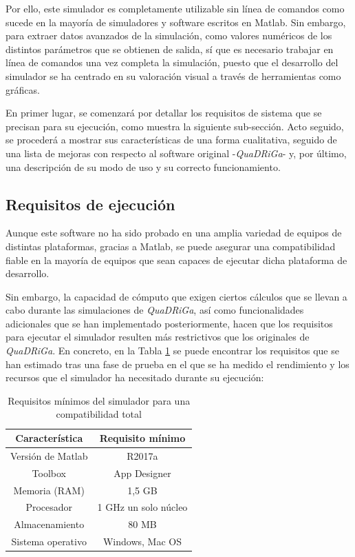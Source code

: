 Por ello, este simulador es completamente utilizable sin línea de comandos como sucede en la mayoría de simuladores y software escritos en Matlab. Sin embargo, para extraer datos avanzados de la simulación, como valores numéricos de los distintos parámetros que se obtienen de salida, sí que es necesario trabajar en línea de comandos una vez completa la simulación, puesto que el desarrollo del simulador se ha centrado en su valoración visual a través de herramientas como gráficas.

En primer lugar, se comenzará por detallar los requisitos de sistema que se precisan para su ejecución, como muestra la siguiente sub-sección. Acto seguido, se procederá a mostrar sus características de una forma cualitativa, seguido de una lista de mejoras con respecto al software original -\textit{QuaDRiGa}- y, por último, una descripción de su modo de uso y su correcto funcionamiento.

\subsection{Requisitos de ejecución}

Aunque este software no ha sido probado en una amplia variedad de equipos de distintas plataformas, gracias a Matlab, se puede asegurar una compatibilidad fiable en la mayoría de equipos que sean capaces de ejecutar dicha plataforma de desarrollo.

Sin embargo, la capacidad de cómputo que exigen ciertos cálculos que se llevan a cabo durante las simulaciones de \textit{QuaDRiGa}, así como funcionalidades adicionales que se han implementado posteriormente, hacen que los requisitos para ejecutar el simulador resulten más restrictivos que los originales de \textit{QuaDRiGa}. En concreto, en la Tabla \ref{tab:espec_simulador} se puede encontrar los requisitos que se han estimado tras una fase de prueba en el que se ha medido el rendimiento y los recursos que el simulador ha necesitado durante su ejecución:

\begin{table}[h!]
\centering
\caption{Requisitos mínimos del simulador para una compatibilidad total}
\label{tab:espec_simulador}
\begin{tabular}{c|c}
\textbf{Característica} & \textbf{Requisito mínimo} \\ \hline
Versión de Matlab       & R2017a             \\
Toolbox                 & App Designer                   \\
Memoria (RAM)           & 1,5 GB                      \\
Procesador              & 1 GHz un solo núcleo      \\
Almacenamiento          & 80 MB                     \\
Sistema operativo       & Windows, Mac OS   
\end{tabular}
\end{table}


